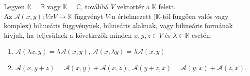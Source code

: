 \begin{frame}
		\begin{tcolorbox}[title={Tétel: Skaláris szorzat}]
 			Legyen $\mathbb{K} = \mathbb{R}$ vagy $\mathbb{K} = \mathbb{C}$, továbbá $V$ vektortér a $\mathbb{K}$ felett.\\
 			
 			 Az $\mathcal{A}(x, y) : V x V \rightarrow \mathbb{K}$ függvényt $V$-n értelmezett ($\mathbb{K}$-tól függően valós vagy komplex) bilineáris függvénynek, bilineáris alaknak, vagy bilineáris formának hívjuk, ha teljesülnek a következők minden $x, y, z \in V$ és $\lambda \in \mathbb{K}$ esetén:
 			 
 			 \begin{enumerate}
 			 \item $\mathcal{A}({\lambda}x, y) = {\lambda} \mathcal{A}(x, y)$, $\mathcal{A}(x, {\lambda}y) = \overline{{\lambda}} \mathcal{A}(x, y)$
			\item $\mathcal{A}(x, y + z) = \mathcal{A}(x, y) + \mathcal{A}(x, z)$, $\mathcal{A}(y + z, x) = \mathcal{A}(y, x) + \mathcal{A}(z, x)$.
 			 \end{enumerate}
		\end{tcolorbox}	
	\end{frame}
	
